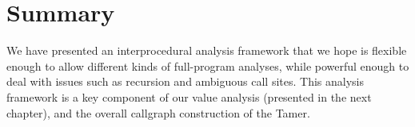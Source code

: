 \section{Summary}

We have presented an interprocedural analysis framework that we 
hope is flexible enough to allow different kinds of full-program analyses,
while powerful enough to deal with issues such as recursion and 
ambiguous call sites. This analysis framework is a key component
of our value analysis (presented in the next chapter), and the overall
callgraph construction of the Tamer.

